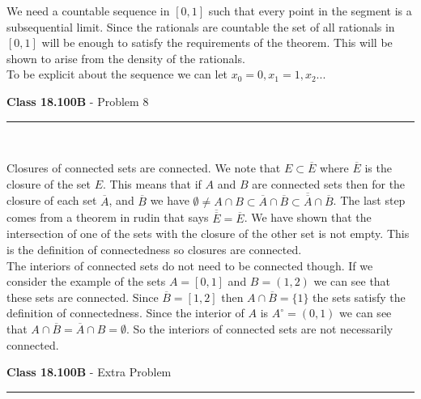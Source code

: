 \documentclass[11pt,reqno]{article}
\begin{document}
We need a countable sequence in $[0,1]$ such that every point in the segment is a subsequential limit. Since the rationals are countable the set of all rationals in $[0,1]$ will be enough to satisfy the requirements of the theorem. This will be shown to arise from the density of the rationals.\\
\indent To be explicit about the sequence we can let $x_0 = 0, x_1 = 1, x_2...$

\vspace{15pt}
\begin{flushleft} 
\textbf{Class 18.100B} - Problem 8\\
\rule{500pt}{1pt}\\
\end{flushleft} 

Closures of connected sets are connected. We note that  $E \subset \overline{E}$ where $\overline{E}$ is the closure of the set $E$. This means that if $A$ and $B$ are connected sets then for the closure of each set $\overline{A}$, and $\overline{B}$ we have $\emptyset \neq A \cap B \subset \overline{A} \cap \overline{B} \subset \overline{\overline{A}} \cap \overline{B}$. The last step comes from a theorem in rudin that says $\overline{\overline{E}} = \overline{E}$. We have shown that the intersection of one of the sets with the closure of the other set is not empty. This is the definition of connectedness so closures are connected.\\
\indent The interiors of connected sets do not need to be connected though. If we consider the example of the sets $A = [ 0, 1 ]$ and $B = (1,2)$ we can see that these sets are connected. Since $\overline{B} = [ 1,2 ]$ then $A \cap \overline{B} = \{ 1 \}$ the sets satisfy the definition of connectedness. Since the interior of $A$ is $A^\circ = (0,1)$ we can see that $A \cap \overline{B} = \overline{A} \cap B = \emptyset $. So the interiors of connected sets are not necessarily connected.

\vspace{15pt}
\begin{flushleft} 
\textbf{Class 18.100B} - Extra Problem \\
\rule{500pt}{1pt}\\
\end{flushleft} 
\end{document}
